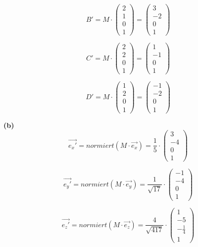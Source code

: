 \documentclass[fleqn]{article}
\begin{document}
$$B' = M\cdot\begin{pmatrix} 2 \\ 1 \\ 0 \\ 1 \end{pmatrix} =\begin{pmatrix} 3 \\ -2 \\ 0 \\ 1 \end{pmatrix} $$

$$C' = M\cdot\begin{pmatrix} 2 \\ 2 \\ 0 \\ 1 \end{pmatrix} =\begin{pmatrix} 1 \\ -1 \\ 0 \\ 1 \end{pmatrix} $$

$$D' = M\cdot\begin{pmatrix} 1 \\ 2 \\ 0 \\ 1 \end{pmatrix} =\begin{pmatrix} -1 \\ -2 \\ 0 \\ 1 \end{pmatrix} $$

\indent\indent\textbf{(b)}
$$\vec{e_{x}'} = normiert(M\cdot \vec{e_{x}}) = \frac{1}{5}\cdot \begin{pmatrix} 3 \\ -4 \\ 0 \\ 1 \end{pmatrix}$$

$$\vec{e_{y}'} = normiert(M\cdot \vec{e_{y}}) = \frac{1}{\sqrt{17}}\cdot \begin{pmatrix} -1 \\ -4 \\ 0 \\ 1 \end{pmatrix}$$

$$\vec{e_{z}'} = normiert(M\cdot \vec{e_{z}}) = \frac{4}{\sqrt{417}}\cdot \begin{pmatrix} 1 \\ -5 \\ -\frac{1}{4} \\ 1 \end{pmatrix}$$
\end{document}
